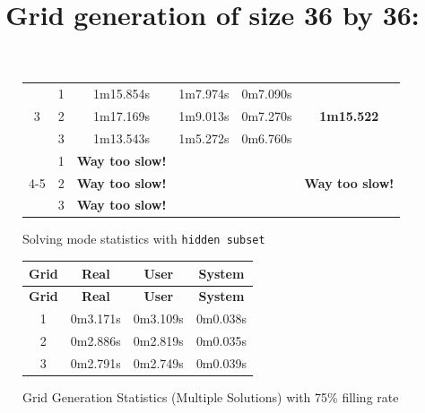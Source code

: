 \documentclass[a4paper, 11pt]{article}
\begin{document}
\begin{figure}[h]
\begin{longtable}{|c|c|c|c|c|c|}
        \multirow{3}{*}{3} & 1 & 1m15.854s & 1m7.974s & 0m7.090s & \multirow{3}{*}{\textbf{1m15.522}} \\
        \cline{2-5}
        & 2 & 1m17.169s & 1m9.013s & 0m7.270s & \\
        \cline{2-5}
        & 3 & 1m13.543s & 1m5.272s & 0m6.760s & \\
        \hline

        \multirow{3}{*}{4-5} & 1 & \textbf{Way too slow!} & & & \multirow{3}{*}{\textbf{Way too slow!}} \\
        \cline{2-5}
        & 2 & \textbf{Way too slow!} & & & \\
        \cline{2-5}
        & 3 & \textbf{Way too slow!} & & & \\
        \hline
    \end{longtable}
    \caption{Solving mode statistics with \texttt{hidden subset}}
\end{figure}


\title{Grid generation of size 36 by 36:}

\begin{figure}[h]
    \centering
    \begin{longtable}{|c|c|c|c|}
        \hline
        \textbf{Grid} & \textbf{Real} & \textbf{User} & \textbf{System} \\
        \hline
        \endfirsthead
        \hline
        \textbf{Grid} & \textbf{Real} & \textbf{User} & \textbf{System} \\
        \hline
        \endhead
        \hline
        \endfoot

        1 & 0m3.171s & 0m3.109s & 0m0.038s \\
        2 & 0m2.886s & 0m2.819s & 0m0.035s \\
        3 & 0m2.791s & 0m2.749s & 0m0.039s \\
        \hline
    \end{longtable}
    \caption{Grid Generation Statistics (Multiple Solutions) with 75\% filling rate}
\end{figure}
\end{document}

